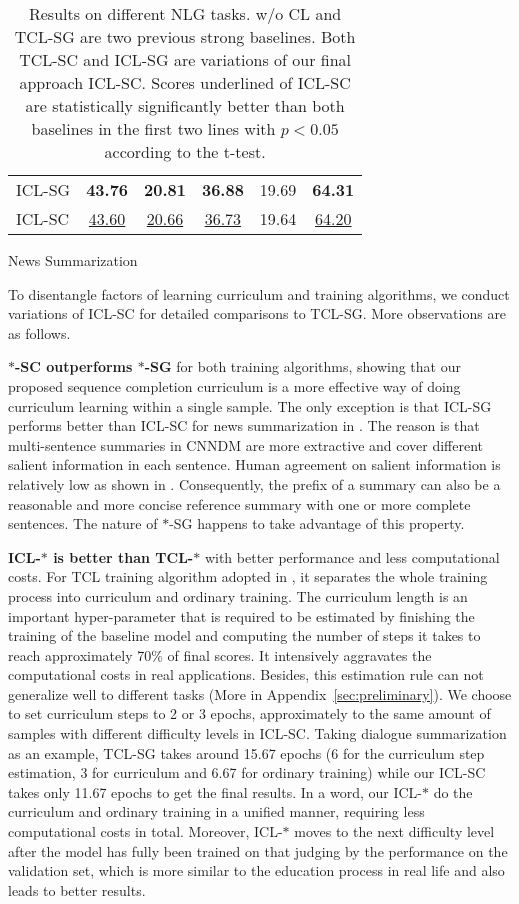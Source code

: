 \begin{table}[th]
\begin{subtable}{\linewidth}
\begin{tabular}{lccccc}
			ICL-SG & \textbf{43.76} & \textbf{20.81} & \textbf{36.88} & 19.69 & \textbf{64.31}\\
			ICL-SC & \underline{{43.60}} & \underline{{20.66}} & \underline{{36.73}} & 19.64 & \underline{{64.20}}\\
			\hline
		\end{tabular}
		\caption{News Summarization}
		\label{tab:end2endns}
	\end{subtable}
	\caption{Results on different NLG tasks. w/o CL and TCL-SG are two previous strong baselines. 
Both TCL-SC and ICL-SG are variations of our final approach ICL-SC. Scores underlined of ICL-SC 
are statistically significantly better than both baselines in the first two lines with $p<0.05$ 
according to the t-test. }	
	\label{tab:end2end}
\end{table}
To disentangle factors of learning curriculum and training algorithms, we conduct variations of ICL-SC for detailed comparisons to TCL-SG. More observations are as follows. 

\textbf{$\ast$-SC outperforms $\ast$-SG} for both training algorithms, showing that our proposed sequence completion curriculum is a more effective way of doing curriculum learning within a single sample. 
The only exception is that ICL-SG performs better than ICL-SC for news summarization in . The reason is that multi-sentence summaries in CNNDM are more extractive and cover different salient information in each sentence. Human agreement on salient information is relatively low as shown in . Consequently, the prefix of a summary can also be a reasonable and more concise 
reference summary with one or more complete sentences. The nature of $\ast$-SG happens to take advantage
of this property.

\textbf{ICL-$\ast$ is better than TCL-$\ast$} with better performance and less computational costs. For TCL training algorithm adopted in \citet{liang-etal-2021-token-wise}, it separates the whole training process into curriculum and ordinary training. The curriculum length is an important hyper-parameter that is required to be estimated by finishing the training of the baseline model and computing the number of steps it takes to reach approximately 70\% of final scores. It intensively aggravates the computational costs in real applications. Besides, this estimation rule can not generalize well to different tasks (More in Appendix~\ref{sec:preliminary}). We choose to set curriculum steps to 2 or 3 epochs, approximately to the same amount of samples with different difficulty levels in ICL-SC. Taking dialogue summarization as an example, TCL-SG takes around 15.67 epochs (6 for the curriculum step estimation, 3 for curriculum and 6.67 for ordinary training) while our ICL-SC takes only 11.67 epochs to get the final results. In a word, our ICL-$\ast$ do the curriculum and ordinary training in a unified manner, requiring less computational costs in total.
Moreover, ICL-$\ast$ moves to the next difficulty level after the model has fully been trained on that judging by the performance on the validation set, which is more similar to the education process in real life and also leads to better results.


